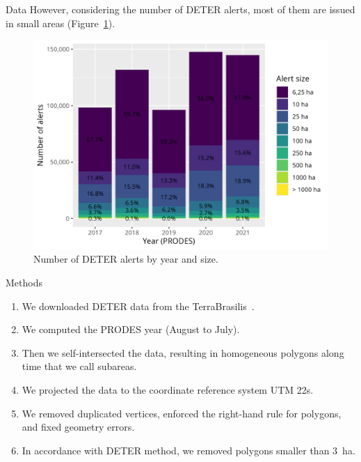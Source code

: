 \documentclass[20pt]{beamer}
\begin{document}
\begin{frame}[fragile,t]
\begin{columns}[t]
\begin{column}{0.33\linewidth}
\begin{block}{Data}
        However, considering the number of DETER alerts, most of them are issued in small areas (Figure~\ref{fig:deter_warnings_size}).

\begin{figure}[h] 
    \begin{center}
    \includegraphics[width=\linewidth]{./figures/deter_warnings_size.png}
    \caption{Number of DETER alerts by year and size.}
    \label{fig:deter_warnings_size}
    \end{center}
\end{figure}

    \end{block}

\vspace{0.5cm}

    \begin{block}{Methods}
        \vspace{0.5cm}
        \begin{enumerate}
            \item We downloaded DETER data from the TerraBrasilis~\cite{f.g.assis2019}. 
            \item We computed the PRODES year (August to July).
            \item Then we self-intersected the data, resulting in homogeneous polygons along time that we call subareas.
            \item We projected the data to the coordinate reference system UTM 22s.
            \item We removed duplicated vertices, enforced the right-hand rule for polygons, and fixed geometry errors.
            \item In accordance with DETER method, we removed polygons smaller than 3~ha.
        \end{enumerate}
        \vspace{0.4cm}
    \end{block}


\end{column}
\end{columns}
\end{frame}
\end{document}
